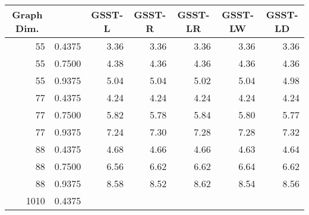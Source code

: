\documentclass[11pt]{article}\usepackage{amsmath}
\begin{document}
\begin{center}\begin{tabular}
[c]{|c|c|c|c|c|c|c|}\hline
\textbf{Graph Dim.} &  & \textbf{GSST-L} & \textbf{GSST-R} &
\textbf{GSST-LR} & \textbf{GSST-LW} & \textbf{GSST-LD}\\\hline
\multicolumn{1}{|r|}{55} & \multicolumn{1}{|r|}{0.4375} &
\multicolumn{1}{|r|}{3.36} & \multicolumn{1}{|r|}{3.36} &
\multicolumn{1}{|r|}{3.36} & \multicolumn{1}{|r|}{3.36} &
\multicolumn{1}{|r|}{3.36}\\\hline
\multicolumn{1}{|r|}{55} & \multicolumn{1}{|r|}{0.7500} &
\multicolumn{1}{|r|}{4.38} & \multicolumn{1}{|r|}{4.36} &
\multicolumn{1}{|r|}{4.36} & \multicolumn{1}{|r|}{4.36} &
\multicolumn{1}{|r|}{4.36}\\\hline
\multicolumn{1}{|r|}{55} & \multicolumn{1}{|r|}{0.9375} &
\multicolumn{1}{|r|}{5.04} & \multicolumn{1}{|r|}{5.04} &
\multicolumn{1}{|r|}{5.02} & \multicolumn{1}{|r|}{5.04} &
\multicolumn{1}{|r|}{4.98}\\\hline
\multicolumn{1}{|r|}{77} & \multicolumn{1}{|r|}{0.4375} &
\multicolumn{1}{|r|}{4.24} & \multicolumn{1}{|r|}{4.24} &
\multicolumn{1}{|r|}{4.24} & \multicolumn{1}{|r|}{4.24} &
\multicolumn{1}{|r|}{4.24}\\\hline
\multicolumn{1}{|r|}{77} & \multicolumn{1}{|r|}{0.7500} &
\multicolumn{1}{|r|}{5.82} & \multicolumn{1}{|r|}{5.78} &
\multicolumn{1}{|r|}{5.84} & \multicolumn{1}{|r|}{5.80} &
\multicolumn{1}{|r|}{5.77}\\\hline
\multicolumn{1}{|r|}{77} & \multicolumn{1}{|r|}{0.9375} &
\multicolumn{1}{|r|}{7.24} & \multicolumn{1}{|r|}{7.30} &
\multicolumn{1}{|r|}{7.28} & \multicolumn{1}{|r|}{7.28} &
\multicolumn{1}{|r|}{7.32}\\\hline
\multicolumn{1}{|r|}{88} & \multicolumn{1}{|r|}{0.4375} &
\multicolumn{1}{|r|}{4.68} & \multicolumn{1}{|r|}{4.66} &
\multicolumn{1}{|r|}{4.66} & \multicolumn{1}{|r|}{4.63} &
\multicolumn{1}{|r|}{4.64}\\\hline
\multicolumn{1}{|r|}{88} & \multicolumn{1}{|r|}{0.7500} &
\multicolumn{1}{|r|}{6.56} & \multicolumn{1}{|r|}{6.62} &
\multicolumn{1}{|r|}{6.62} & \multicolumn{1}{|r|}{6.64} &
\multicolumn{1}{|r|}{6.62}\\\hline
\multicolumn{1}{|r|}{88} & \multicolumn{1}{|r|}{0.9375} &
\multicolumn{1}{|r|}{8.58} & \multicolumn{1}{|r|}{8.52} &
\multicolumn{1}{|r|}{8.62} & \multicolumn{1}{|r|}{8.54} &
\multicolumn{1}{|r|}{8.56}\\\hline
\multicolumn{1}{|r|}{1010} & \multicolumn{1}{|r|}{0.4375} &

\end{tabular}
\end{center}
\end{document}
